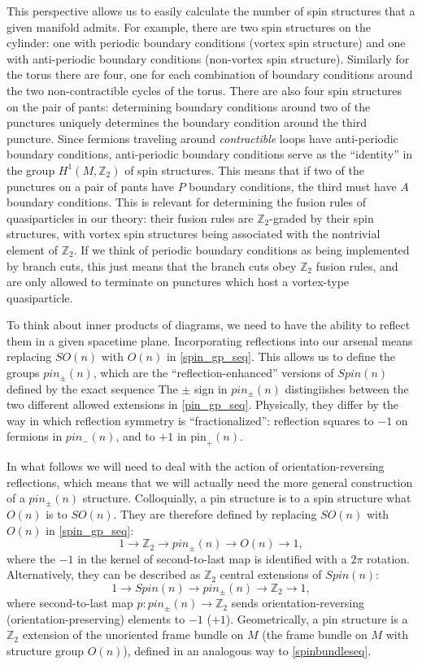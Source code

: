 \documentclass[12pt,a4paper]{article}
\newcounter{arrow}
\newcommand{\ra}{\rightarrow}
\newcommand{\zt}{\mathbb{Z}_2}
\newcommand\be            {\begin{equation}}
\newcommand\ee            {\end{equation}}
\newcommand{\pin}{\text{pin}}
\begin{document}
This perspective allows us to easily calculate the number of spin structures that a given manifold admits. 
For example, there are two spin structures on the cylinder: one with periodic boundary conditions (vortex 
spin structure) and one with anti-periodic boundary conditions (non-vortex spin structure). Similarly for the 
torus there are four, one for each combination of boundary conditions around the two non-contractible 
cycles of the torus. There are also four spin structures on the pair of pants: determining boundary 
conditions around two of the punctures uniquely determines the boundary condition around the third 
puncture. Since fermions traveling around {\it contractible} loops have anti-periodic boundary conditions, 
anti-periodic boundary conditions serve as the ``identity'' in the group $H^1(M,\zt)$ of spin structures. This 
means that if two of the punctures on a pair of pants have $P$ boundary conditions, the third must have 
$A$ boundary conditions. This is relevant for determining the fusion rules of quasiparticles in our theory: 
their fusion rules are $\zt$-graded by their spin structures, with vortex spin structures being associated 
with the nontrivial element of $\zt$. If we think of periodic boundary conditions as being implemented by 
branch cuts, this just means that the branch cuts obey $\zt$ fusion rules, and are only allowed to terminate 
on punctures which host a vortex-type quasiparticle. 


To think about inner products of diagrams, we need to have the ability to reflect them in a given spacetime plane. Incorporating reflections into our arsenal means replacing $SO(n)$ with $O(n)$ in \eqref{spin_gp_seq}. This allows us to define the groups $pin_\pm(n)$, which are the ``reflection-enhanced'' versions of $Spin(n)$ defined by the exact sequence 
 The $\pm$ sign in $pin_\pm(n)$ distingiishes between the two different allowed extensions in \eqref{pin_gp_seq}. Physically, they differ by the way in which reflection symmetry is ``fractionalized'': reflection squares to $-1$ on fermions in $pin_-(n)$, and to $+1$ in $\pin_+(n)$. 


In what follows we will need to deal with the action of orientation-reversing reflections, which means that we will actually need the more general construction of a $pin_\pm(n)$ structure. Colloquially, a pin structure is to a spin structure what $O(n)$ is to $SO(n)$. They are therefore defined by replacing $SO(n)$ with $O(n)$ in \eqref{spin_gp_seq}:
\be \label{pin_gp_seq} 1 \ra \zt \ra pin_\pm(n) \ra O(n) \ra 1,\ee
where the $-1$ in the kernel of second-to-last map is identified with a $2\pi$ rotation.
Alternatively, they can be described as $\zt$ central extensions of $Spin(n)$:
\be \label{pinseq} 1\ra Spin(n) \ra pin_\pm(n) \ra \zt \ra 1,\ee 
where second-to-last map $p : pin_\pm(n) \ra \zt$ sends orientation-reversing (orientation-preserving) elements to $-1$ ($+1$). Geometrically, a pin structure is a $\zt$ extension of the unoriented frame bundle on $M$ (the frame bundle on $M$ with structure group $O(n)$), defined in an analogous way to \eqref{spinbundleseq}.
\end{document}
